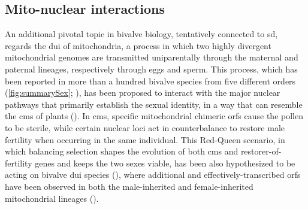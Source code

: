 \subsection{Mito-nuclear interactions}
An additional pivotal topic in bivalve biology, tentatively connected to \gls{sd}, regards the \gls{dui} of mitochondria, a process in which two highly divergent mitochondrial genomes are transmitted uniparentally through the maternal and paternal lineages, respectively through eggs and sperm. This process, which has been reported in more than a hundred bivalve species from five different orders (\cref{fig:summarySex}; ), has been proposed to interact with the major nuclear pathways that primarily establish the sexual identity, in a way that can resemble the \gls{cms} of plants (). In \gls{cms}, specific mitochondrial chimeric \glspl{orf} cause the pollen to be sterile, while certain nuclear loci act in counterbalance to restore male fertility when occurring in the same individual. This Red-Queen scenario, in which balancing selection shapes the evolution of both \gls{cms} and restorer-of-fertility genes and keeps the two sexes viable, has been also hypothesized to be acting on bivalve \gls{dui} species (), where additional and effectively-transcribed \glspl{orf} have been observed in both the male-inherited and female-inherited mitochondrial lineages ().

